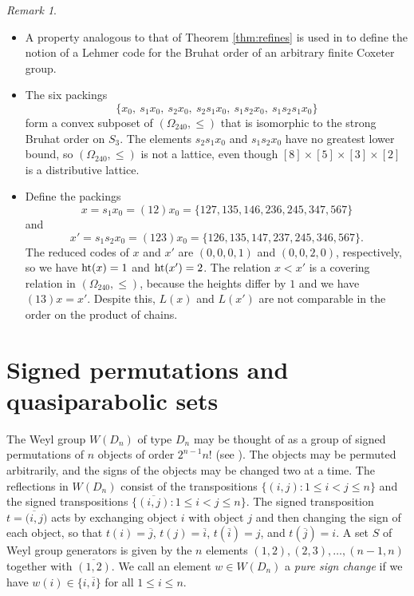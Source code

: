\documentclass{amsart}
\theoremstyle{plain}
\theoremstyle{definition}
\theoremstyle{remark}
\newtheorem{rmk}[theorem]{Remark}
\numberwithin{equation}{section}
\newcommand{\rootht}{\text{\rm ht}}
\newcommand{\qpx}{\Omega_{240}}
\begin{document}
\begin{rmk}\label{rmk:refines}
\begin{itemize}
\item[(i)]{A property analogous to that of Theorem \ref{thm:refines} is used in \cite[Definition 4.2]{bolognini25} 
to define the notion of a Lehmer code for the Bruhat order of an arbitrary finite Coxeter group.}
\item[(ii)]{The six packings $$
\{x_0, \ s_1 x_0, \ s_2 x_0, \ s_2 s_1 x_0, \ s_1 s_2 x_0, \ s_1 s_2 s_1 x_0\}
$$ form a convex subposet of $(\qpx, \leq)$ that is isomorphic to the strong Bruhat order on $S_3$. The elements
$s_2 s_1 x_0$ and $s_1 s_2 x_0$ have no greatest lower bound, so $(\qpx, \leq)$ is not a lattice, even though 
$[8] \times [5] \times [3] \times [2]$ is a distributive lattice.}
\item[(iii)]{Define the packings $$
x = s_1 x_0 = (12)x_0
= \{127, 135, 146, 236, 245, 347, 567\}
$$ and $$
x' = s_1 s_2 x_0 = (123)x_0
= \{126, 135, 147, 237, 245, 346, 567\}
.$$ The reduced codes of $x$ and $x'$ are $(0, 0, 0, 1)$ and $(0, 0, 2, 0)$, respectively, so we have
$\rootht(x)=1$ and $\rootht(x')=2$. The relation $x < x'$ is a covering relation in $(\qpx, \leq)$, because
the heights differ by $1$ and we have $(13)x=x'$. Despite this, $L(x)$ and $L(x')$ are not comparable in the
order on the product of chains.}
\end{itemize}
\end{rmk}

\section{Signed permutations and quasiparabolic sets}\label{sec:signed}

The Weyl group $W(D_n)$ of type $D_n$ may be thought of as a group of signed permutations of $n$ objects of order 
$2^{n-1}n!$ (see \cite[\S2]{humphreys90}). The objects may be permuted arbitrarily, and the signs of the objects 
may be changed two at a time. The reflections in $W(D_n)$ consist of the transpositions
$\{(i, j) : 1 \leq i < j \leq n\}$ and the signed transpositions $\{\overline{(i, j)} : 1 \leq i < j \leq n\}$.
The signed transposition $t = \overline{(i, j})$ acts by exchanging object $i$ with object $j$ and then changing
the sign of each object, so that $t(i) = \overline{j}$, $t(j) = \overline{i}$, $t(\overline{i}) = j$, and
$t(\overline{j}) = i$. A set $S$ of Weyl group generators is given by the $n$ elements 
$(1, 2), (2, 3), \ldots, (n-1, n)$ together with $\overline{(1, 2)}$. We call an element $w \in W(D_n)$ 
a {\it pure sign change} if we have $w(i) \in \{i, \overline{i}\}$ for all $1 \leq i \leq n$.
\end{document}
